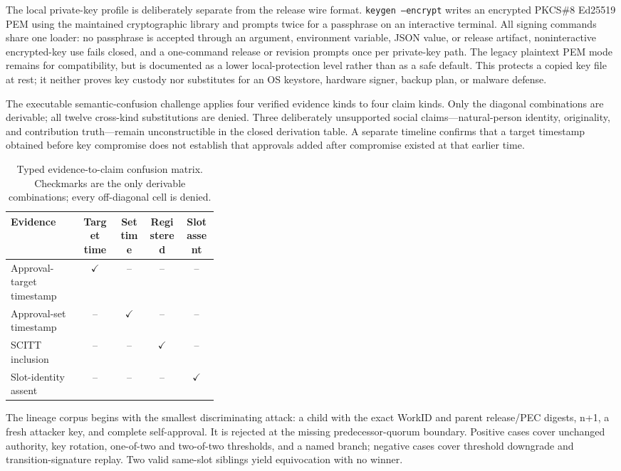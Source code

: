 \documentclass[conference,compsoc]{IEEEtran}
\begin{document}
The local private-key profile is deliberately separate from the release wire
format. \texttt{keygen --encrypt} writes an encrypted PKCS\#8 Ed25519 PEM using
the maintained cryptographic library and prompts twice for a passphrase on an
interactive terminal. All signing commands share one loader: no passphrase is
accepted through an argument, environment variable, JSON value, or release
artifact, noninteractive encrypted-key use fails closed, and a one-command
release or revision prompts once per private-key path. The legacy plaintext PEM
mode remains for compatibility, but is documented as a lower local-protection
level rather than as a safe default. This protects a copied key file at rest;
it neither proves key custody nor substitutes for an OS keystore, hardware
signer, backup plan, or malware defense.

The executable semantic-confusion challenge applies four verified evidence
kinds to four claim kinds. Only the diagonal combinations are derivable; all
twelve cross-kind substitutions are denied. Three deliberately unsupported
social claims---natural-person identity, originality, and contribution
truth---remain unconstructible in the closed derivation table. A separate
timeline confirms that a target timestamp obtained before key compromise does
not establish that approvals added after compromise existed at that earlier
time.

\begin{table}[t]
\centering
\caption{Typed evidence-to-claim confusion matrix. Checkmarks are the only
derivable combinations; every off-diagonal cell is denied.}
\begin{tabular}{p{0.34\linewidth}cccc}
\toprule
Evidence & Target time & Set time & Registered & Slot assent \\
\midrule
Approval-target timestamp & $\checkmark$ & -- & -- & -- \\
Approval-set timestamp & -- & $\checkmark$ & -- & -- \\
SCITT inclusion & -- & -- & $\checkmark$ & -- \\
Slot-identity assent & -- & -- & -- & $\checkmark$ \\
\bottomrule
\end{tabular}
\end{table}

The lineage corpus begins with the smallest discriminating attack: a child
with the exact WorkID and parent release/PEC digests, n+1, a fresh attacker
key, and complete self-approval. It is rejected at the missing
predecessor-quorum boundary. Positive cases cover unchanged authority, key
rotation, one-of-two and two-of-two thresholds, and a named branch; negative
cases cover threshold downgrade and transition-signature replay. Two valid
same-slot siblings yield equivocation with no winner.
\end{document}
